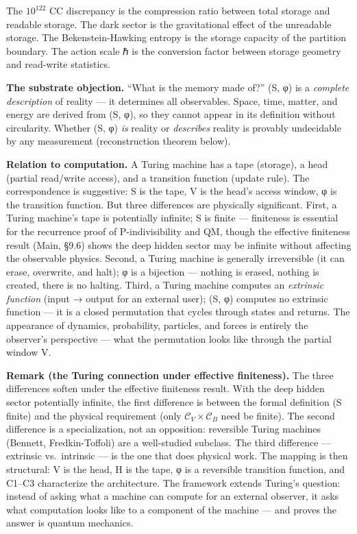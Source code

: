 \documentclass[
  11pt,
]{article}
\begin{document}
The \(10^{122}\) CC discrepancy is the compression ratio between total
storage and readable storage. The dark sector is the gravitational
effect of the unreadable storage. The Bekenstein-Hawking entropy is the
storage capacity of the partition boundary. The action scale ℏ is the
conversion factor between storage geometry and read-write statistics.

\textbf{The substrate objection.} ``What is the memory made of?'' (S, φ)
is a \emph{complete description} of reality --- it determines all
observables. Space, time, matter, and energy are derived from (S, φ), so
they cannot appear in its definition without circularity. Whether (S, φ)
\emph{is} reality or \emph{describes} reality is provably undecidable by
any measurement (reconstruction theorem below).

\textbf{Relation to computation.} A Turing machine has a tape (storage),
a head (partial read/write access), and a transition function (update
rule). The correspondence is suggestive: S is the tape, V is the head's
access window, φ is the transition function. But three differences are
physically significant. First, a Turing machine's tape is potentially
infinite; S is finite --- finiteness is essential for the recurrence
proof of P-indivisibility and QM, though the effective finiteness result
(Main, §9.6) shows the deep hidden sector may be infinite without
affecting the observable physics. Second, a Turing machine is generally
irreversible (it can erase, overwrite, and halt); φ is a bijection ---
nothing is erased, nothing is created, there is no halting. Third, a
Turing machine computes an \emph{extrinsic function} (input → output for
an external user); (S, φ) computes no extrinsic function --- it is a
closed permutation that cycles through states and returns. The
appearance of dynamics, probability, particles, and forces is entirely
the observer's perspective --- what the permutation looks like through
the partial window V.

\textbf{Remark (the Turing connection under effective finiteness).} The
three differences soften under the effective finiteness result. With the
deep hidden sector potentially infinite, the first difference is between
the formal definition (S finite) and the physical requirement (only
\(\mathcal{C}_V \times \mathcal{C}_B\) need be finite). The second
difference is a specialization, not an opposition: reversible Turing
machines (Bennett, Fredkin-Toffoli) are a well-studied subclass. The
third difference --- extrinsic vs.~intrinsic --- is the one that does
physical work. The mapping is then structural: V is the head, H is the
tape, φ is a reversible transition function, and C1--C3 characterize the
architecture. The framework extends Turing's question: instead of asking
what a machine can compute for an external observer, it asks what
computation looks like to a component of the machine --- and proves the
answer is quantum mechanics.
\end{document}
